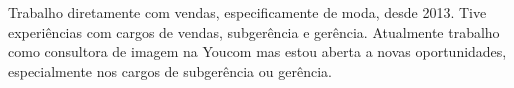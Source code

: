

\begin{cvparagraph}



Trabalho diretamente com vendas, especificamente de moda, desde 2013. Tive experiências com cargos de vendas, subgerência e gerência. Atualmente
trabalho como consultora de imagem na Youcom mas estou aberta a novas oportunidades, especialmente nos cargos de subgerência ou gerência.


\end{cvparagraph}